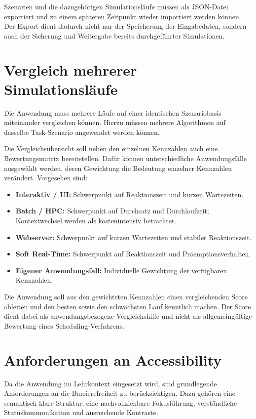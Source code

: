 Szenarien und die dazugehörigen Simulationsläufe müssen als JSON-Datei exportiert und zu einem späteren Zeitpunkt wieder importiert werden können. Der Export dient dadurch nicht nur der Speicherung der Eingabedaten, sondern auch der Sicherung und Weitergabe bereits durchgeführter Simulationen.

\section{Vergleich mehrerer Simulationsläufe}

Die Anwendung muss mehrere Läufe auf einer identischen Szenariobasis miteinander vergleichen können. Hierzu müssen mehrere Algorithmen auf dasselbe Task-Szenario angewendet werden können.

Die Vergleichsübersicht soll neben den einzelnen Kennzahlen auch eine Bewertungsmatrix bereitstellen. Dafür können unterschiedliche Anwendungsfälle ausgewählt werden, deren Gewichtung die Bedeutung einzelner Kennzahlen verändert. Vorgesehen sind:

\begin{itemize}
    \item \textbf{Interaktiv / UI:} Schwerpunkt auf Reaktionszeit und kurzen Wartezeiten.
    \item \textbf{Batch / HPC:} Schwerpunkt auf Durchsatz und Durchlaufzeit; Kontextwechsel werden als kostenintensiv betrachtet.
    \item \textbf{Webserver:} Schwerpunkt auf kurzen Wartezeiten und stabiler Reaktionszeit.
    \item \textbf{Soft Real-Time:} Schwerpunkt auf Reaktionszeit und Präemptionsverhalten.
    \item \textbf{Eigener Anwendungsfall:} Individuelle Gewichtung der verfügbaren Kennzahlen.
\end{itemize}

Die Anwendung soll aus den gewichteten Kennzahlen einen vergleichenden Score ableiten und den besten sowie den schwächsten Lauf kenntlich machen. Der Score dient dabei als anwendungsbezogene Vergleichshilfe und nicht als allgemeingültige Bewertung eines Scheduling-Verfahrens.

\section{Anforderungen an Accessibility}

Da die Anwendung im Lehrkontext eingesetzt wird, sind grundlegende Anforderungen an die Barrierefreiheit zu berücksichtigen. Dazu gehören eine semantisch klare Struktur, eine nachvollziehbare Fokusführung, verständliche Statuskommunikation und ausreichende Kontraste.

